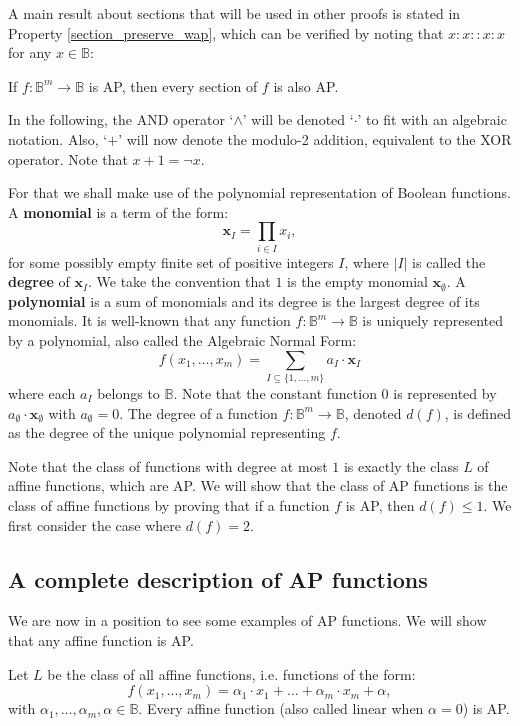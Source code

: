 A main result about sections that will be used in other proofs is stated in
Property \ref{section_preserve_wap}, which can be verified by noting that
$x:x::x:x$ for any $x \in \mathbb{B}$:

\begin{property}\label{section_preserve_wap}
If $f\colon \mathbb{B}^m\to \mathbb{B}$ is AP, then every section of $f$ is
also AP.  \end{property}

In the following, the AND operator `$\wedge$' will be denoted `$\cdot$' to fit
with an algebraic notation. Also, `$+$' will now denote the modulo-2 addition,
equivalent to the XOR operator. Note that $x + 1 = \neg x$.

For that we shall make use of the  polynomial representation of Boolean functions.
A \textbf{ monomial} is a term of the form:
$$
\mathbf{x}_I=\underset{i\in I}{\prod}x_i, $$ for some possibly empty finite set of
positive integers $I$, where $|I|$ is called the \textbf{degree} of
$\mathbf{x}_I$.   We take the convention that $1$ is the empty monomial
$\mathbf{x}_\emptyset $. A \textbf{ polynomial} is a sum of monomials and its
degree is the largest degree of its monomials.  It is well-known
\cite{StoneAlgebra36,ZhegalkinAlgebra27} that any function
$f:\mathbb{B}^m\rightarrow \mathbb{B}$ is uniquely represented by a polynomial,
also called the Algebraic Normal Form: $$f(x_1,\ldots,x_m)=\sum_{I\subseteq
\{1,\ldots,m\}}a_I\cdot \mathbf{x}_I$$ where each $a_I$ belongs to
$\mathbb{B}$. Note that the constant function $0$ is represented by
$a_\emptyset\cdot \mathbf{x}_\emptyset$ with $a_\emptyset =0$. The degree of a
function $f:\mathbb{B}^m\rightarrow \mathbb{B}$, denoted $d(f)$, is defined as
the degree of the unique polynomial representing $f$.

Note that the class of functions with degree at most $1$ is exactly the class
$L$ of affine functions, which are AP. We will show that the class of AP
functions is the class of affine functions by proving that if a function $f$ is
AP, then $d(f)\leq 1$. We first consider the case where $d(f) = 2$.


\subsection{A complete description of AP functions}

We are now in a position to see some examples of AP functions. We will show that
any affine function is AP.

\begin{proposition}\label{affine_functions_are_wap}
Let $L$ be the class of all affine functions, i.e. functions of the form:
  $$f(x_1,\ldots , x_m)=\alpha_1\cdot x_1+\ldots +\alpha_m\cdot  x_m+\alpha,$$
  with $\alpha_1,\ldots, \alpha_m,\alpha\in \mathbb{B}$. Every affine function
  (also called linear when $\alpha = 0$) is AP.
\end{proposition}

